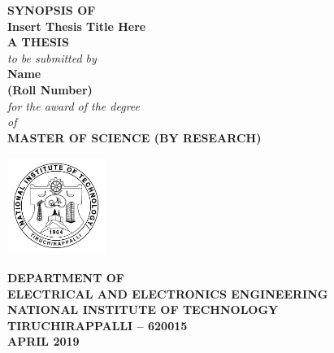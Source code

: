 \begin{titlepage}
\begin{center}
\thispagestyle{empty}
\large
\textbf{SYNOPSIS OF}\\
\bigskip
\large{\textbf{Insert Thesis Title Here}}
\\
\bigskip \bigskip \bigskip \bigskip  
\large
\textbf {A THESIS}\\
\emph{to be submitted by}\\
\bigskip \bigskip \bigskip \bigskip
\textbf{Name}\\
\textbf{(Roll Number)}
\\
\bigskip \bigskip \bigskip \bigskip
\emph{for the award of the degree}\\ \bigskip \bigskip
\emph{of}\\
\bigskip \bigskip
\textbf{MASTER OF SCIENCE (BY RESEARCH)}\\

\bigskip \bigskip \bigskip \bigskip \bigskip  
\centering

\includegraphics[width=1.25in, height=1.25in]{NITT} %

\bigskip \bigskip
\normalsize
\large\textbf{DEPARTMENT OF}\\
\large\textbf{ELECTRICAL AND ELECTRONICS ENGINEERING}\\ %
\large\textbf{NATIONAL INSTITUTE OF TECHNOLOGY}\\
\large\textbf{TIRUCHIRAPPALLI -- 620015}\\
\vspace{0.20in}
\large\textbf{APRIL 2019} %
\end{center}
\end{titlepage} 